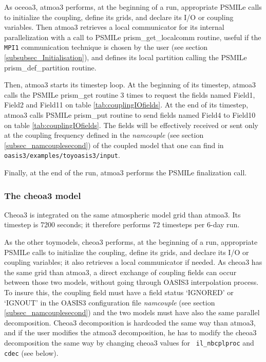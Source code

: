 As oceoa3, atmoa3 performs, at the beginning of a run, appropriate
PSMILe calls to initialize the coupling, define its grids, and declare
its I/O or coupling variables. Then atmoa3 retrieves a local
communicator for its internal parallelization with a call to PSMILe
prism\_get\_localcomm routine, useful if the {\tt MPI1} communication
technique is chosen by the user (see section
\ref{subsubsec_Initialisation}), and defines its local
partition calling the PSMILe
prism\_def\_partition routine.


Then, atmoa3 starts its timestep loop. At the beginning of its timestep,
atmoa3 calls the PSMILe prism\_get routine 3 times to request the fields
named Field1, Field2 and Field11 on table
\ref{tab:couplingIOfields}. At the end of its timestep, atmoa3 calls
PSMILe prism\_put routine to send  fields named Field4 to Field10 on
table \ref{tab:couplingIOfields}. The fields will be effectively
received or sent only at the coupling frequency defined in the {\it namcouple}
(see section \ref{subsec_namcouplesecond}) of the coupled model that one can
find in {\tt oasis3/examples/toyoasis3/input}. 



Finally, at the end of the run, atmoa3 performs the PSMILe finalization call.

\subsubsection{The cheoa3 model}
\label{sec:cheoa3} 

Cheoa3
is integrated on the same atmospheric model grid than atmoa3. Its
timestep is 7200 seconds; it therefore performs 72 timesteps per 6-day
run.

As the other toymodels, cheoa3 performs, at the beginning of a run,
appropriate PSMILe calls to initialize the coupling, define its grids,
and declare its I/O or coupling variables; it also retrieves a local
communicator if needed. As cheoa3 has the same grid than atmoa3, a direct
exchange of coupling fields can occur between those two models,
without going through OASIS3 interpolation process. To insure this,
the coupling field must have a field status `IGNORED' or `IGNOUT' in
the OASIS3 configuration file {\it namcouple} (see section
\ref{subsec_namcouplesecond}) and the two models must have also the same
parallel decomposition.  Cheoa3 decomposition is hardcoded the same way
than atmoa3, and if the user modifies the atmoa3 decomposition, he has to
modify the cheoa3 decomposition the same way by changing cheoa3 values for {\tt
il\_nbcplproc} and {\tt cdec} (see below).

